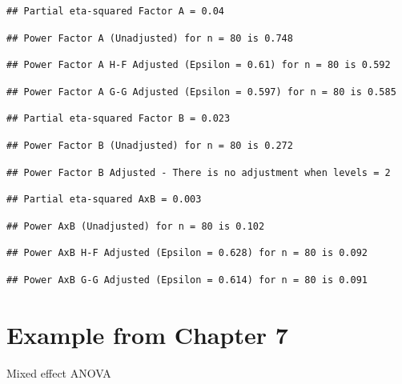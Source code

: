 \documentclass[
]{book}
\begin{document}
\begin{verbatim}
## Partial eta-squared Factor A = 0.04
\end{verbatim}

\begin{verbatim}
## Power Factor A (Unadjusted) for n = 80 is 0.748
\end{verbatim}

\begin{verbatim}
## Power Factor A H-F Adjusted (Epsilon = 0.61) for n = 80 is 0.592
\end{verbatim}

\begin{verbatim}
## Power Factor A G-G Adjusted (Epsilon = 0.597) for n = 80 is 0.585
\end{verbatim}

\begin{verbatim}
## Partial eta-squared Factor B = 0.023
\end{verbatim}

\begin{verbatim}
## Power Factor B (Unadjusted) for n = 80 is 0.272
\end{verbatim}

\begin{verbatim}
## Power Factor B Adjusted - There is no adjustment when levels = 2
\end{verbatim}

\begin{verbatim}
## Partial eta-squared AxB = 0.003
\end{verbatim}

\begin{verbatim}
## Power AxB (Unadjusted) for n = 80 is 0.102
\end{verbatim}

\begin{verbatim}
## Power AxB H-F Adjusted (Epsilon = 0.628) for n = 80 is 0.092
\end{verbatim}

\begin{verbatim}
## Power AxB G-G Adjusted (Epsilon = 0.614) for n = 80 is 0.091
\end{verbatim}

\hypertarget{example-from-chapter-7}{%
\section{Example from Chapter 7}\label{example-from-chapter-7}}

Mixed effect ANOVA
\end{document}
